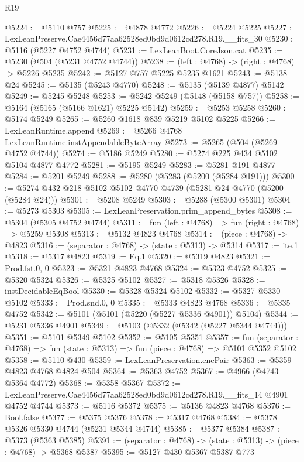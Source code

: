 \begin{lexlean}{R19}
\begin{coremodule}
{{{{{{{{{{{@5224 := @5110 @757
@5225 := @4878 @4772
@5226 := @5224 @5225
@5227 := LexLeanPreserve.Cae4456d77aa62528ed0bd9d0612cd278.R19.__fits_30
@5230 := @5116 (@5227 @4752 @4744)
@5231 := LexLeanBoot.CoreJson.cat
@5235 := @5230 (@504 (@5231 @4752 @4744))
@5238 := (left : @4768) -> (right : @4768) -> @5226 @5235
@5242 := @5127 @757 @5225 @5235 @1621
@5243 := @5138 @24
@5245 := @5135 (@5243 @4770)
@5248 := @5135 (@5139 @4877) @5142
@5249 := @5245 @5248
@5253 := @5242 @5249 (@5148 (@5158 @757))
@5258 := @5164 (@5165 (@5166 @1621) @5225 @5142)
@5259 := @5253 @5258
@5260 := @5174 @5249
@5265 := @5260 @1618 @839 @5219 @5102 @5225
@5266 := LexLeanRuntime.append
@5269 := @5266 @4768 LexLeanRuntime.instAppendableByteArray
@5273 := @5265 (@504 (@5269 @4752 @4744))
@5274 := @5186 @5249
@5280 := @5274 @225 @434 @5102 @5104 @4877 @4772
@5281 := @5195 @5249
@5283 := @5281 @191 @4877
@5284 := @5201 @5249
@5288 := @5280 (@5283 (@5200 (@5284 @191)))
@5300 := @5274 @432 @218 @5102 @5102 @4770 @4739 (@5281 @24 @4770 (@5200 (@5284 @24)))
@5301 := @5208 @5249
@5303 := @5288 (@5300 @5301)
@5304 := @5273 @5303
@5305 := LexLeanPreservation.prim_append_bytes
@5308 := @5304 (@5305 @4752 @4744)
@5311 := fun (left : @4768) => fun (right : @4768) => @5259 @5308
@5313 := @5132 @4823 @4768
@5314 := (piece : @4768) -> @4823
@5316 := (separator : @4768) -> (state : @5313) -> @5314
@5317 := ite.{1}
@5318 := @5317 @4823
@5319 := Eq.{1}
@5320 := @5319 @4823
@5321 := Prod.fst.{0, 0}
@5323 := @5321 @4823 @4768
@5324 := @5323 @4752
@5325 := @5320 @5324
@5326 := @5325 @5102
@5327 := @5318 @5326
@5328 := instDecidableEqBool
@5330 := @5328 @5324 @5102
@5332 := @5327 @5330 @5102
@5333 := Prod.snd.{0, 0}
@5335 := @5333 @4823 @4768
@5336 := @5335 @4752
@5342 := @5101 (@5101 (@5220 (@5227 @5336 @4901)) @5104)
@5344 := @5231 @5336 @4901
@5349 := @5103 (@5332 (@5342 (@5227 @5344 @4744)))
@5351 := @5101 @5349 @5102
@5352 := @5105 @5351
@5357 := fun (separator : @4768) => fun (state : @5313) => fun (piece : @4768) => @5101 @5352 @5102
@5358 := @5110 @430
@5359 := LexLeanPreservation.encPair
@5363 := @5359 @4823 @4768 @4824 @504
@5364 := @5363 @4752
@5367 := @4966 (@4743 @5364 @4772)
@5368 := @5358 @5367
@5372 := LexLeanPreserve.Cae4456d77aa62528ed0bd9d0612cd278.R19.__fits_14 @4901 @4752 @4744
@5373 := @5116 @5372
@5375 := @5136 @4823 @4768
@5376 := Bool.false
@5377 := @5375 @5376
@5378 := @5317 @4768
@5384 := @5378 @5326 @5330 @4744 (@5231 @5344 @4744)
@5385 := @5377 @5384
@5387 := @5373 (@5363 @5385)
@5391 := (separator : @4768) -> (state : @5313) -> (piece : @4768) -> @5368 @5387
@5395 := @5127 @430 @5367 @5387 @773
}}}}}}}}}}}
\end{coremodule}
\end{lexlean}
